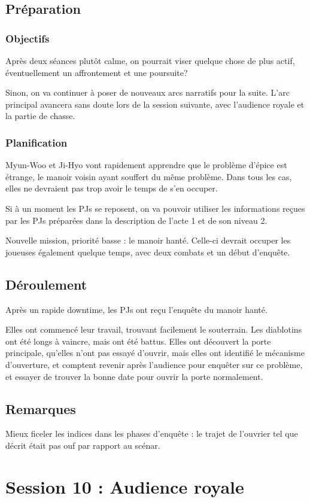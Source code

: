\documentclass[10pt,a4paper]{book}
\begin{document}
\subsection{Préparation}
\subsubsection{Objectifs}
Après deux séances plutôt calme, on pourrait viser quelque chose de plus actif, éventuellement un affrontement et une poursuite?

Sinon, on va continuer à poser de nouveaux arcs narratifs pour la suite. L'arc principal avancera sans doute lors de la session suivante, avec l'audience royale et la partie de chasse.
\subsubsection{Planification}
Myun-Woo et Ji-Hyo vont rapidement apprendre que le problème d'épice est étrange, le manoir voisin ayant souffert du même problème. Dans tous les cas, elles ne devraient pas trop avoir le temps de s'en occuper.

Si à un moment les PJs se reposent, on va pouvoir utiliser les informations reçues par les PJs préparées dans la description de l'acte 1 et de son niveau 2.

Nouvelle mission, priorité basse : le manoir hanté. Celle-ci devrait occuper les joueuses également quelque temps, avec deux combats et un début d'enquête.
\subsection{Déroulement}
Après un rapide downtime, les PJs ont reçu l'enquête du manoir hanté.

Elles ont commencé leur travail, trouvant facilement le souterrain. Les diablotins ont été longs à vaincre, mais ont été battus. Elles ont découvert la porte principale, qu'elles n'ont pas essayé d'ouvrir, mais elles ont identifié le mécanisme d'ouverture, et comptent revenir après l'audience pour enquêter sur ce problème, et essayer de trouver la bonne date pour ouvrir la porte normalement.
\subsection{Remarques}

Mieux ficeler les indices dans les phases d'enquête : le trajet de l'ouvrier tel que décrit était pas ouf par rapport au scénar.
\section{Session 10 : Audience royale}
\end{document}
